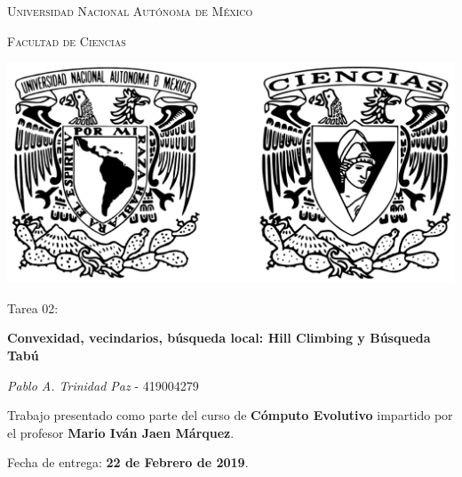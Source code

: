 \documentclass[10pt,letterpaper]{article}
\begin{document}
\begin{titlepage}
    \centering

    {\scshape\LARGE Universidad Nacional Autónoma de México \par}

    \vspace{1cm}
    {\scshape\Large Facultad de Ciencias\par}
    \vspace{1.5cm}

    \begin{center}
        \includegraphics[scale=.1]{../../assets/img/logo.png}
    \end{center}

    \vspace{.8 cm}

    {\LARGE Tarea 02: \par}
    {\huge\bfseries Convexidad, vecindarios, búsqueda local: Hill Climbing y Búsqueda Tabú \par}

    \vspace{0.5cm}
    \large{\itshape{Pablo A. Trinidad Paz}} \small{ - 419004279}

    \vfill

    Trabajo presentado como parte del curso de
    \textbf{Cómputo Evolutivo}
    impartido por el profesor \textbf{Mario Iván Jaen Márquez}. \par
    \vspace{0.5cm}
    Fecha de entrega: \textbf{22 de Febrero de 2019}.
\end{titlepage}
\end{document}
